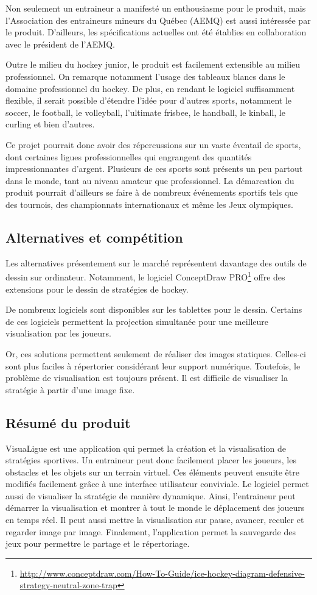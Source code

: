 Non seulement un entraineur a manifesté un enthousiasme pour le produit, mais l'Association des entraineurs mineurs du Québec (AEMQ) est aussi intéressée par le produit. D'ailleurs, les spécifications actuelles ont été établies en collaboration avec le président de l'AEMQ.

Outre le milieu du hockey junior, le produit est facilement extensible au milieu professionnel. On remarque notamment l'usage des tableaux blancs dans le domaine professionnel du hockey. De plus, en rendant le logiciel suffisamment flexible, il serait possible d'étendre l'idée pour d'autres sports, notamment le soccer, le football, le volleyball, l'ultimate frisbee, le handball, le kinball, le curling et bien d'autres.

Ce projet pourrait donc avoir des répercussions sur un vaste éventail de sports, dont certaines ligues professionnelles qui engrangent des quantités impressionnantes d'argent. Plusieurs de ces sports sont présents un peu partout dans le monde, tant au niveau amateur que professionnel. La démarcation du produit pourrait d'ailleurs se faire à de nombreux événements sportifs tels que des tournois, des championnats internationaux et même les Jeux olympiques.

\subsection{Alternatives et compétition}
Les alternatives présentement sur le marché représentent davantage des outils de dessin sur ordinateur. Notamment, le logiciel ConceptDraw PRO\footnote{\url{http://www.conceptdraw.com/How-To-Guide/ice-hockey-diagram-defensive-strategy-neutral-zone-trap}} offre des extensions pour le dessin de stratégies de hockey.

De nombreux logiciels sont disponibles sur les tablettes pour le dessin. Certains de ces logiciels permettent la projection simultanée pour une meilleure visualisation par les joueurs.

Or, ces solutions permettent seulement de réaliser des images statiques. Celles-ci sont plus faciles à répertorier considérant leur support numérique. Toutefois, le problème de visualisation est toujours présent. Il est difficile de visualiser la stratégie à partir d'une image fixe.

\subsection{Résumé du produit}
VisuaLigue est une application qui permet la création et la visualisation de stratégies sportives. Un entraineur peut donc facilement placer les joueurs, les obstacles et les objets sur un terrain virtuel. Ces éléments peuvent ensuite être modifiés facilement grâce à une interface utilisateur conviviale. Le logiciel permet aussi de visualiser la stratégie de manière dynamique. Ainsi, l'entraineur peut démarrer la visualisation et montrer à tout le monde le déplacement des joueurs en temps réel. Il peut aussi mettre la visualisation sur pause, avancer, reculer et regarder image par image. Finalement, l'application permet la sauvegarde des jeux pour permettre le partage et le répertoriage.

